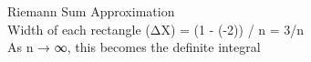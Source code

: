 \documentclass[preview]{standalone}
\begin{document}
\begin{center}
Riemann Sum Approximation\\Width of each rectangle (ΔX) = (1 - (-2)) / n = 3/n\\As n → ∞, this becomes the definite integral
\end{center}
\end{document}
